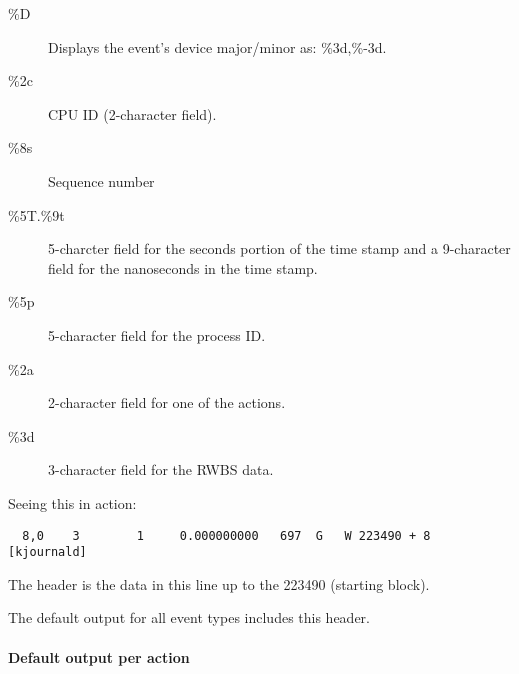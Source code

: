 \documentclass{article}
\begin{document}
\begin{description}
  \item[\%D] Displays the event's device major/minor as: \%3d,\%-3d.
  \item[\%2c] CPU ID (2-character field).
  \item[\%8s] Sequence number
  \item[\%5T.\%9t] 5-charcter field for the seconds portion of the
  time stamp and a 9-character field for the nanoseconds in the time stamp.
  \item[\%5p] 5-character field for the process ID.
  \item[\%2a] 2-character field for one of the actions.
  \item[\%3d] 3-character field for the RWBS data.
\end{description}

Seeing this in action:

\begin{verbatim}
  8,0    3        1     0.000000000   697  G   W 223490 + 8 [kjournald]
\end{verbatim}

The header is the data in this line up to the 223490 (starting block). 

The default output for all event types includes this header.

\paragraph{Default output per action}
\end{document}
